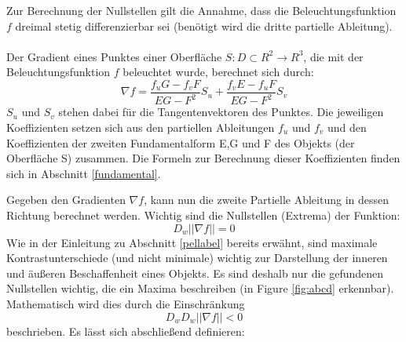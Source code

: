 \documentclass{paperStyle}
\begin{document}
Zur Berechnung der Nullstellen gilt die Annahme, dass die Beleuchtungsfunktion $f$ dreimal stetig differenzierbar sei (benötigt wird die dritte partielle Ableitung). \\\\
Der Gradient eines Punktes einer Oberfläche $S : D \subset R^{2} \longrightarrow R^{3}$, die mit der Beleuchtungsfunktion $f$ beleuchtet wurde, berechnet sich durch:
\begin{equation}
\nabla f = \frac{ f_{ u }G - f_{ v }F }{EG - F^{ 2 }  }S_{ u } + \frac{ f_{ v }E - f_{ u }F }{EG - F^{ 2 } } S_{ v }
	\label{eq:gradientf}
\end{equation}
$S_{ u } $ und $S_{ v }$ stehen dabei für die Tangentenvektoren des Punktes. Die jeweiligen Koeffizienten setzen sich aus den partiellen Ableitungen $f_{ u }$ und $f_{ v }$ und den Koeffizienten der zweiten Fundamentalform E,G und F des Objekts (der Oberfläche S) zusammen. Die Formeln zur Berechnung dieser Koeffizienten finden sich in Abschnitt \ref{fundamental}.

Gegeben den Gradienten $\nabla f$, kann nun die zweite Partielle Ableitung in dessen Richtung berechnet werden. Wichtig sind die Nullstellen (Extrema) der Funktion:
\begin{equation}
D_{w}||\nabla f || = 0
	\label{eq:dw}
\end{equation}
Wie in der Einleitung zu Abschnitt \ref{pellabel} bereits erwähnt, sind maximale Kontrastunterschiede (und nicht minimale) wichtig zur Darstellung der inneren und äußeren Beschaffenheit eines Objekts. Es sind deshalb nur die gefundenen Nullstellen wichtig, die ein Maxima beschreiben (in Figure \ref{fig:abcd} erkennbar). Mathematisch wird dies durch die Einschränkung
\begin{equation}
D_{w}D_{w}||\nabla f || < 0
\label{eq:dwdw}
\end{equation}
beschrieben. Es lässt sich abschließend definieren:
\end{document}
